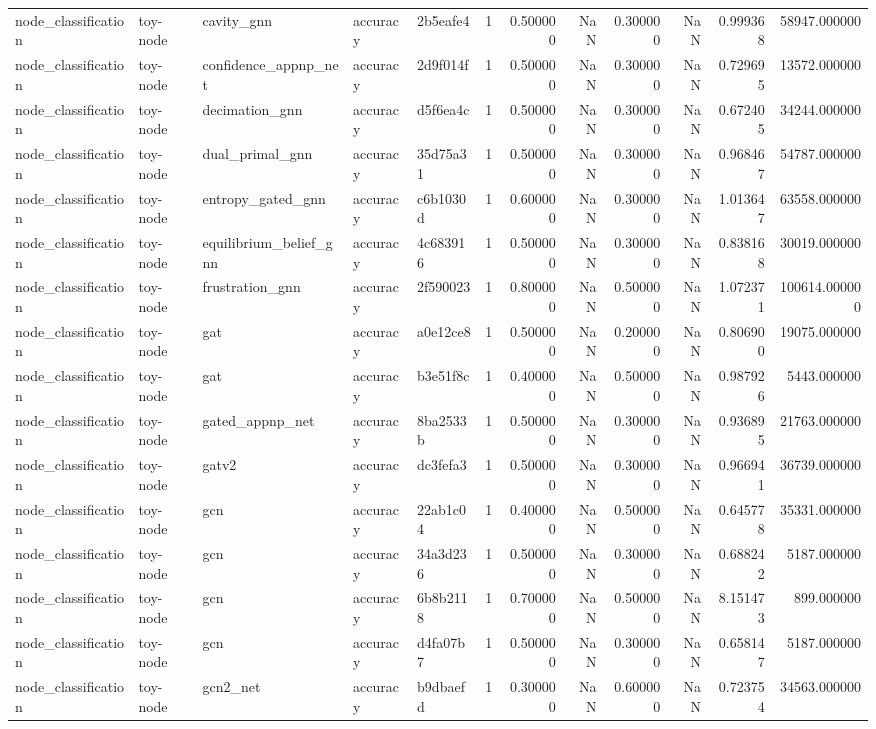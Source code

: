 \begin{tabular}{lllllrrrrrrr}
node_classification & toy-node & cavity_gnn & accuracy & 2b5eafe4 & 1 & 0.500000 & NaN & 0.300000 & NaN & 0.999368 & 58947.000000 \\
node_classification & toy-node & confidence_appnp_net & accuracy & 2d9f014f & 1 & 0.500000 & NaN & 0.300000 & NaN & 0.729695 & 13572.000000 \\
node_classification & toy-node & decimation_gnn & accuracy & d5f6ea4c & 1 & 0.500000 & NaN & 0.300000 & NaN & 0.672405 & 34244.000000 \\
node_classification & toy-node & dual_primal_gnn & accuracy & 35d75a31 & 1 & 0.500000 & NaN & 0.300000 & NaN & 0.968467 & 54787.000000 \\
node_classification & toy-node & entropy_gated_gnn & accuracy & c6b1030d & 1 & 0.600000 & NaN & 0.300000 & NaN & 1.013647 & 63558.000000 \\
node_classification & toy-node & equilibrium_belief_gnn & accuracy & 4c683916 & 1 & 0.500000 & NaN & 0.300000 & NaN & 0.838168 & 30019.000000 \\
node_classification & toy-node & frustration_gnn & accuracy & 2f590023 & 1 & 0.800000 & NaN & 0.500000 & NaN & 1.072371 & 100614.000000 \\
node_classification & toy-node & gat & accuracy & a0e12ce8 & 1 & 0.500000 & NaN & 0.200000 & NaN & 0.806900 & 19075.000000 \\
node_classification & toy-node & gat & accuracy & b3e51f8c & 1 & 0.400000 & NaN & 0.500000 & NaN & 0.987926 & 5443.000000 \\
node_classification & toy-node & gated_appnp_net & accuracy & 8ba2533b & 1 & 0.500000 & NaN & 0.300000 & NaN & 0.936895 & 21763.000000 \\
node_classification & toy-node & gatv2 & accuracy & dc3fefa3 & 1 & 0.500000 & NaN & 0.300000 & NaN & 0.966941 & 36739.000000 \\
node_classification & toy-node & gcn & accuracy & 22ab1c04 & 1 & 0.400000 & NaN & 0.500000 & NaN & 0.645778 & 35331.000000 \\
node_classification & toy-node & gcn & accuracy & 34a3d236 & 1 & 0.500000 & NaN & 0.300000 & NaN & 0.688242 & 5187.000000 \\
node_classification & toy-node & gcn & accuracy & 6b8b2118 & 1 & 0.700000 & NaN & 0.500000 & NaN & 8.151473 & 899.000000 \\
node_classification & toy-node & gcn & accuracy & d4fa07b7 & 1 & 0.500000 & NaN & 0.300000 & NaN & 0.658147 & 5187.000000 \\
node_classification & toy-node & gcn2_net & accuracy & b9dbaefd & 1 & 0.300000 & NaN & 0.600000 & NaN & 0.723754 & 34563.000000 \\

\end{tabular}
